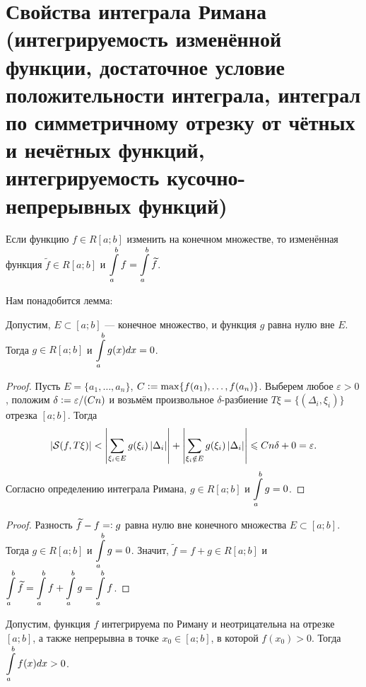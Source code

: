 \section{Свойства интеграла Римана (интегрируемость изменённой функции, достаточное условие положительности интеграла, интеграл по симметричному отрезку от чётных и нечётных функций, интегрируемость кусочно-непрерывных функций)}

\begin{theorem}
    Если функцию $f \in R[a; b]$ изменить на конечном множестве, то изменённая функция $\widetilde{f} \in R[a; b]$ и $\displaystyle\int\limits_a^bf = \int\limits_a^b\widetilde{f}$.
\end{theorem}

Нам понадобится лемма:

\begin{lemma}
    Допустим, $E \subset [a; b]$ --- конечное множество, и функция $g$ равна нулю вне $E$. Тогда $g \in R[a; b]$ и $\displaystyle\int\limits_a^bg(x)dx = 0$.
\end{lemma}

\begin{proof}
    Пусть $E = \{a_1, \ldots, a_n\}$, $C \vcentcolon = \max\{f(a_1), \ldots, f(a_n)\}$. Выберем любое $\varepsilon > 0$, положим $\delta \vcentcolon = \varepsilon / (Cn)$ и возьмём произвольное $\delta$-разбиение $T\xi = \{(\Delta_i, \xi_i)\}$ отрезка $[a; b]$. Тогда
    \[
        \left\lvert\mathcal{S}(f, T\xi)\right\rvert < \left\lvert\sum_{\xi_i \in E}g(\xi_i)\left\lvert\Delta_i\right\rvert\right\rvert + \left\lvert\sum_{\xi_i \notin E}g(\xi_i)\left\lvert\Delta_i\right\rvert\right\rvert \leqslant Cn\delta + 0 = \varepsilon.
    \]
    Согласно определению интеграла Римана, $g \in R[a; b]$ и $\displaystyle\int\limits_a^bg = 0$.
\end{proof}

\begin{proof}
    Разность $\widetilde{f} - f = \vcentcolon g$ равна нулю вне конечного множества $E \subset [a; b]$. Тогда $g \in R[a; b]$ и $\displaystyle\int\limits_a^bg = 0$. Значит, $\widetilde{f} = f + g \in R[a; b]$ и $\displaystyle\int\limits_a^b\widetilde{f} = \int\limits_a^bf + \int\limits_a^bg = \int\limits_a^bf$.
\end{proof}

\begin{theorem}
    Допустим, функция $f$ интегрируема по Риману и неотрицательна на отрезке $[a; b]$, а также непрерывна в точке $x_0 \in [a; b]$, в которой $f(x_0) > 0$. Тогда $\displaystyle\int\limits_a^bf(x)dx > 0$.
\end{theorem}


